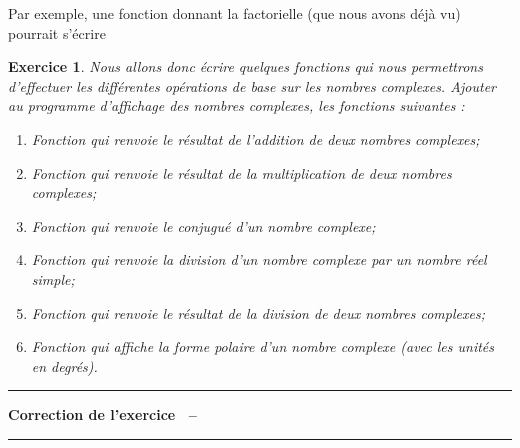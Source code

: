 \documentclass[a4paper]{article}
\newtheorem{Exo}{Exercice}
\newenvironment{Correction}{\par\tiny\blue\rule[1ex]{\textwidth}{1pt}\par\normalsize\textbf{Correction de l'exercice~\theExo{} -- }}{\par\tiny\blue\rule[1ex]{\textwidth}{1pt}\par}
\begin{document}
		Par exemple, une fonction donnant la factorielle (que nous avons déjà vu) pourrait s'écrire
		\begin{Exo}
			Nous allons donc écrire quelques fonctions qui nous permettrons d'effectuer les différentes opérations de base sur les nombres complexes.
			Ajouter au programme d'affichage des nombres complexes, les fonctions suivantes :
			\begin{enumerate}
				\item Fonction qui renvoie le résultat de l'addition de deux nombres complexes;
				\item Fonction qui renvoie le résultat de la multiplication de deux nombres complexes;
				\item Fonction qui renvoie le conjugué d'un nombre complexe;
				\item Fonction qui renvoie la division d'un nombre complexe par un nombre réel simple;
				\item Fonction qui renvoie le résultat de la division de deux nombres complexes;
				\item Fonction qui affiche la forme polaire d'un nombre complexe (avec les unités en degrés).
			\end{enumerate}
		\end{Exo}
		\begin{Correction}
		\end{Correction}
\end{document}
